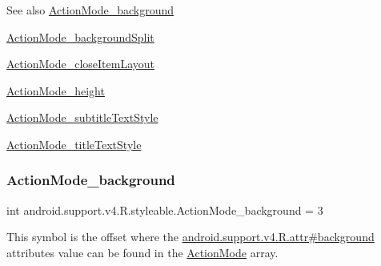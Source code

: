 \begin{DoxySeeAlso}{See also}
\hyperlink{classandroid_1_1support_1_1v4_1_1R_1_1styleable_af8dfe84037d44a20d600812c83f8ae9f}{Action\+Mode\+\_\+background} 

\hyperlink{classandroid_1_1support_1_1v4_1_1R_1_1styleable_a094ac55778c3da81ee995f4d661dcdd3}{Action\+Mode\+\_\+background\+Split} 

\hyperlink{classandroid_1_1support_1_1v4_1_1R_1_1styleable_ac74559c17d14835068971c8a43ee0089}{Action\+Mode\+\_\+close\+Item\+Layout} 

\hyperlink{classandroid_1_1support_1_1v4_1_1R_1_1styleable_a4c33e09d0d28a0556eb95a6d8e79d430}{Action\+Mode\+\_\+height} 

\hyperlink{classandroid_1_1support_1_1v4_1_1R_1_1styleable_adf85b77127f085c08ae9f7876b127ae8}{Action\+Mode\+\_\+subtitle\+Text\+Style} 

\hyperlink{classandroid_1_1support_1_1v4_1_1R_1_1styleable_a76cacf108986d54131f84ffbda5ddc84}{Action\+Mode\+\_\+title\+Text\+Style} 
\end{DoxySeeAlso}
\mbox{\label{classandroid_1_1support_1_1v4_1_1R_1_1styleable_af8dfe84037d44a20d600812c83f8ae9f}} 
\subsubsection{\texorpdfstring{Action\+Mode\+\_\+background}{ActionMode\_background}}
{\footnotesize\ttfamily int android.\+support.\+v4.\+R.\+styleable.\+Action\+Mode\+\_\+background = 3\hspace{0.3cm}{\ttfamily [static]}}

This symbol is the offset where the \hyperlink{classandroid_1_1support_1_1v4_1_1R_1_1attr_a3aa8b955b1ba13d9d418c7ac9c23b291}{android.\+support.\+v4.\+R.\+attr\#background} attribute\textquotesingle{}s value can be found in the \hyperlink{classandroid_1_1support_1_1v4_1_1R_1_1styleable_abc7d063172fa73270c0ab8e5f7093972}{Action\+Mode} array.

